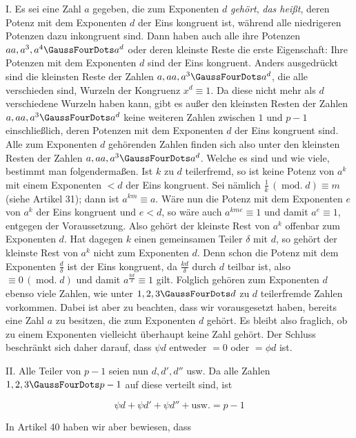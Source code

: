 I. Es sei eine Zahl $a$ gegeben, die zum Exponenten $d$ \emph{gehört}, \emph{das heißt}, deren Potenz mit dem Exponenten $d$ der Eins kongruent ist, während alle niedrigeren Potenzen dazu inkongruent sind. Dann haben auch alle ihre Potenzen $aa,a^3,a^4\GaussFourDots a^d$ oder deren kleinste Reste die erste Eigenschaft: Ihre Potenzen mit dem Exponenten $d$ sind der Eins kongruent. Anders ausgedrückt sind die kleinsten Reste der Zahlen $a,aa,a^3\GaussFourDots a^d$, die alle verschieden sind, Wurzeln der Kongruenz $x^d\equiv1$. Da diese nicht mehr als $d$ verschiedene Wurzeln haben kann, gibt es außer den kleinsten Resten der Zahlen $a,aa,a^3\GaussFourDots a^d$ keine weiteren Zahlen zwischen $1$ und $p-1$ einschließlich, deren Potenzen mit dem Exponenten $d$ der Eins kongruent sind. Alle zum Exponenten $d$ gehörenden Zahlen finden sich also unter den kleinsten Resten der Zahlen $a,aa,a^3\GaussFourDots a^d$. Welche es sind und wie viele, bestimmt man folgendermaßen. Ist $k$ zu $d$ teilerfremd, so ist keine Potenz von $a^k$ mit einem Exponenten $<d$ der Eins kongruent. Sei nämlich $\frac{1}{k}\,(\operatorname{mod.}d)\equiv m$ (siehe Artikel 31); dann ist $a^{km}\equiv a$. Wäre nun die Potenz mit dem Exponenten $e$ von $a^k$ der Eins kongruent und $e<d$, so wäre auch $a^{kme}\equiv1$ und damit $a^e\equiv1$, entgegen der Voraussetzung. Also gehört der kleinste Rest von $a^k$ offenbar zum Exponenten $d$. Hat dagegen $k$ einen gemeinsamen Teiler $\delta$ mit $d$, so gehört der kleinste Rest von $a^k$ nicht zum Exponenten $d$. Denn schon die Potenz mit dem Exponenten ${\frac{d}{\delta}}$ ist der Eins kongruent, da $\frac{kd}{\delta}$ durch $d$ teilbar ist, also $\equiv0\,(\operatorname{mod.}d)$ und damit $a^{\frac{kd}{\delta}}\equiv1$ gilt. Folglich gehören zum Exponenten $d$ ebenso viele Zahlen, wie unter $1,2,3\GaussFourDots d$ zu $d$ teilerfremde Zahlen vorkommen. Dabei ist aber zu beachten, dass wir vorausgesetzt haben, bereits eine Zahl $a$ zu besitzen, die zum Exponenten $d$ gehört. Es bleibt also fraglich, ob zu einem Exponenten vielleicht überhaupt keine Zahl gehört. Der Schluss beschränkt sich daher darauf, dass $\psi d$ entweder $=0$ oder $=\phi d$ ist.


II. Alle Teiler von $p-1$ seien nun $d,d',d''$ usw. Da alle Zahlen $1,2,3\GaussFourDots p-1$ auf diese verteilt sind, ist

\[\psi d+\psi d'+\psi d''+\text{usw.}=p-1\]

In Artikel 40 haben wir aber bewiesen, dass

